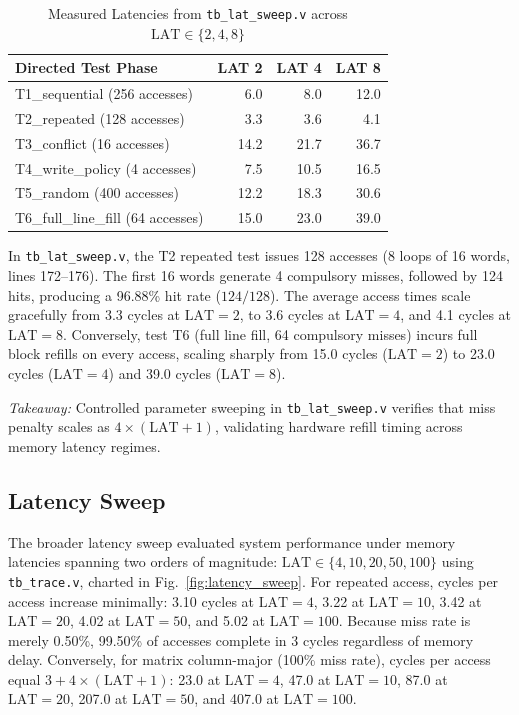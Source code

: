 \documentclass[conference]{IEEEtran}
\begin{document}
\begin{table}[htbp]
\caption{Measured Latencies from \texttt{tb\_lat\_sweep.v} across $\text{LAT}\in\{2, 4, 8\}$}
\label{tab:lat_sweep_tb}
\centering
\begin{tabular}{lrrr}
\toprule
\textbf{Directed Test Phase} & \textbf{LAT 2} & \textbf{LAT 4} & \textbf{LAT 8} \\
\midrule
T1\_sequential (256 accesses) & 6.0 & 8.0 & 12.0 \\
T2\_repeated (128 accesses) & 3.3 & 3.6 & 4.1 \\
T3\_conflict (16 accesses) & 14.2 & 21.7 & 36.7 \\
T4\_write\_policy (4 accesses) & 7.5 & 10.5 & 16.5 \\
T5\_random (400 accesses) & 12.2 & 18.3 & 30.6 \\
T6\_full\_line\_fill (64 accesses) & 15.0 & 23.0 & 39.0 \\
\bottomrule
\end{tabular}
\end{table}

In \texttt{tb\_lat\_sweep.v}, the T2 repeated test issues 128 accesses (8 loops of 16 words, lines 172--176). The first 16 words generate 4 compulsory misses, followed by 124 hits, producing a 96.88\% hit rate ($124/128$). The average access times scale gracefully from 3.3 cycles at $\text{LAT}=2$, to 3.6 cycles at $\text{LAT}=4$, and 4.1 cycles at $\text{LAT}=8$. Conversely, test T6 (full line fill, 64 compulsory misses) incurs full block refills on every access, scaling sharply from 15.0 cycles ($\text{LAT}=2$) to 23.0 cycles ($\text{LAT}=4$) and 39.0 cycles ($\text{LAT}=8$).

\textit{Takeaway:} Controlled parameter sweeping in \texttt{tb\_lat\_sweep.v} verifies that miss penalty scales as $4 \times (\text{LAT}+1)$, validating hardware refill timing across memory latency regimes.

\subsection{Latency Sweep}
The broader latency sweep evaluated system performance under memory latencies spanning two orders of magnitude: $\text{LAT}\in\{4, 10, 20, 50, 100\}$ using \texttt{tb\_trace.v}, charted in Fig.~\ref{fig:latency_sweep}. For repeated access, cycles per access increase minimally: 3.10 cycles at $\text{LAT}=4$, 3.22 at $\text{LAT}=10$, 3.42 at $\text{LAT}=20$, 4.02 at $\text{LAT}=50$, and 5.02 at $\text{LAT}=100$. Because miss rate is merely 0.50\%, 99.50\% of accesses complete in 3 cycles regardless of memory delay. Conversely, for matrix column-major (100\% miss rate), cycles per access equal $3 + 4 \times (\text{LAT}+1)$: 23.0 at $\text{LAT}=4$, 47.0 at $\text{LAT}=10$, 87.0 at $\text{LAT}=20$, 207.0 at $\text{LAT}=50$, and 407.0 at $\text{LAT}=100$.
\end{document}
